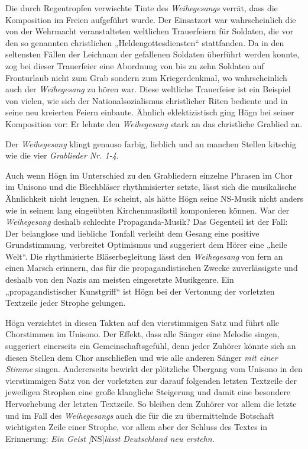 \documentclass{book}
\newcommand{\zitat}[1]{\textit{#1}}
\begin{document}
Die durch Regentropfen verwischte Tinte des \textit{Weihegesangs}
verrät, dass die Komposition im Freien aufgeführt wurde. Der Einsatzort
war wahrscheinlich die von der Wehrmacht veranstalteten weltlichen
Trauerfeiern für Soldaten, die vor den so genannten christlichen
„Heldengottesdiensten“ stattfanden. Da in den seltensten Fällen der
Leichnam der gefallenen Soldaten überführt werden konnte, zog bei
dieser Trauerfeier eine Abordnung von bis zu zehn Soldaten auf
Fronturlaub nicht zum Grab sondern zum Kriegerdenkmal, wo
wahrscheinlich auch der \textit{Weihegesang} zu hören war. Diese
weltliche Trauerfeier ist ein Beispiel von vielen, wie sich der
Nationalsozialismus christlicher Riten bediente und in seine neu
kreierten Feiern einbaute. Ähnlich eklektizistisch ging Högn bei seiner
Komposition vor: Er lehnte den \textit{Weihegesang} stark an das
christliche Grablied an.

Der \textit{Weihegesang} klingt genauso farbig, lieblich und an manchen
Stellen kitschig wie die vier \textit{Grablieder Nr. 1-4}.

Auch wenn Högn im Unterschied zu den Grabliedern einzelne Phrasen im
Chor im Unisono und die Blechbläser rhythmisierter setzte, lässt sich
die musikalische Ähnlichkeit nicht leugnen. Es scheint, als hätte Högn
seine NS-Musik nicht anders wie in seinem lang eingeübten
Kirchenmusikstil komponieren können. War der \textit{Weihegesang}
deshalb schlechte Propaganda-Musik? Das Gegenteil ist der Fall: Der
belanglose und liebliche Tonfall verleiht dem Gesang eine positive
Grundstimmung, verbreitet Optimismus und suggeriert dem Hörer eine
„heile Welt“. Die rhythmisierte Bläserbegleitung lässt den
\textit{Weihegesang} von fern an einen Marsch erinnern, das für die
propagandistischen Zwecke zuverlässigste und deshalb von den Nazis am
meisten eingesetzte Musikgenre. Ein „propagandistischer Kunstgriff“ ist
Högn bei der Vertonung der vorletzten Textzeile jeder Strophe gelungen.

Högn verzichtet in diesen Takten auf den vierstimmigen Satz und führt
alle Chorstimmen im Unisono. Der Effekt, dass alle Sänger eine Melodie
singen, suggeriert einerseits ein Gemeinschaftsgefühl, denn jeder
Zuhörer könnte sich an diesen Stellen dem Chor anschließen und wie alle
anderen Sänger \textit{mit einer Stimme} singen. Andererseits bewirkt
der plötzliche Übergang vom Unisono in den vierstimmigen Satz von der
vorletzten zur darauf folgenden letzten Textzeile der jeweiligen
Strophen eine große klangliche Steigerung und damit eine besondere
Hervorhebung der letzten Textzeile. So bleiben dem Zuhörer vor allem
die letzte und im Fall des \textit{Weihegesangs} auch die für die zu
übermittelnde Botschaft wichtigsten Zeile einer Strophe, vor allem aber
der Schluss des Textes in Erinnerung: \zitat{Ein Geist
 \textup{[}}NS]\zitat{lässt Deutschland neu erstehn.}
\end{document}
